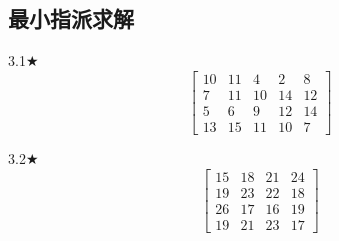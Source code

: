\subsection{最小指派求解}

\begin{problem}{3.1$\bigstar$}
    $$\begin{bmatrix}
        10 & 11 & 4 & 2 & 8\\
        7 & 11 & 10 & 14 & 12\\
        5 & 6 & 9 & 12 & 14\\
        13 & 15 & 11 & 10 & 7
    \end{bmatrix}$$
\end{problem}

\begin{problem}{3.2$\bigstar$}
    $$\begin{bmatrix}
        15 & 18 & 21 & 24\\
        19 & 23 & 22 & 18\\
        26 & 17 & 16 & 19\\
        19 & 21 & 23 & 17
    \end{bmatrix}$$
\end{problem}